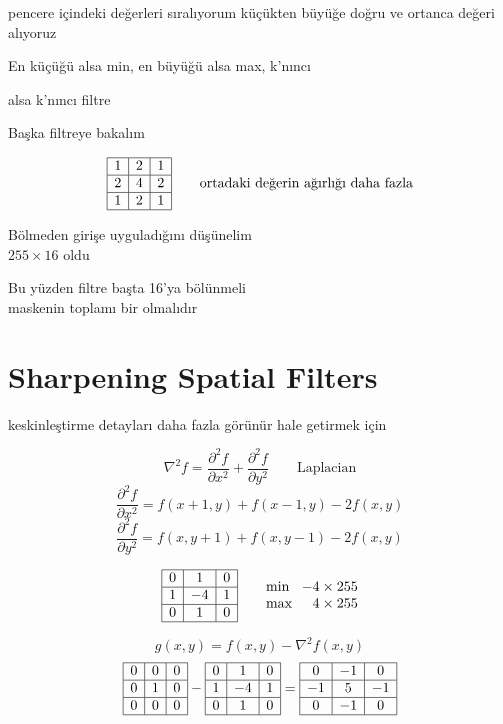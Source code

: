 \documentclass[11pt,a4paper]{article}
\begin{document}

pencere içindeki değerleri sıralıyorum küçükten büyüğe doğru ve ortanca değeri alıyoruz

En küçüğü alsa min, en büyüğü alsa max, k'nıncı

alsa k'nıncı filtre

Başka filtreye bakalım

\[
\begin{array}{|c|c|c|}\hline 1&2&1\\\hline 2&4&2\\\hline 1&2&1\\\hline\end{array}
\qquad \text{ortadaki değerin ağırlığı daha fazla}
\]

\noindent Bölmeden girişe uyguladığını düşünelim\\
\hspace*{2em} $255\times16$ oldu

\noindent Bu yüzden filtre başta 16'ya bölünmeli\\
\hspace*{2em} maskenin toplamı bir olmalıdır

\section{Sharpening Spatial Filters}
keskinleştirme detayları daha fazla görünür hale getirmek için

\[ \nabla^2 f = \frac{\partial^2 f}{\partial x^2} + \frac{\partial^2 f}{\partial y^2} \qquad \text{Laplacian} \]
\[ \frac{\partial^2 f}{\partial x^2} = f(x+1,y) + f(x-1,y) - 2f(x,y) \]
\[ \frac{\partial^2 f}{\partial y^2} = f(x,y+1) + f(x,y-1) - 2f(x,y) \]

\[
\begin{array}{|c|c|c|}\hline 0&1&0\\\hline 1&-4&1\\\hline 0&1&0\\\hline\end{array}
\qquad
\begin{array}{@{}l@{\ \ }r@{}} \min & -4\times255\\ \max & 4\times255 \end{array}
\]

\[ g(x,y) = f(x,y) - \nabla^2 f(x,y) \]
\[
\begin{array}{|c|c|c|}\hline 0&0&0\\\hline 0&1&0\\\hline 0&0&0\\\hline\end{array}
-
\begin{array}{|c|c|c|}\hline 0&1&0\\\hline 1&-4&1\\\hline 0&1&0\\\hline\end{array}
=
\begin{array}{|c|c|c|}\hline 0&-1&0\\\hline -1&5&-1\\\hline 0&-1&0\\\hline\end{array}
\]
\end{document}
